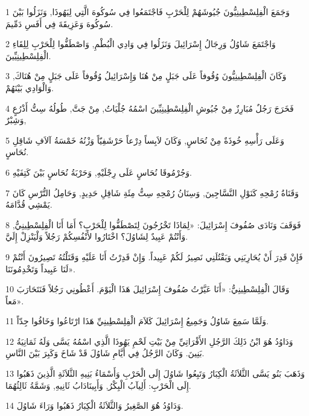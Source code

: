 \par 1 وَجَمَعَ الْفِلِسْطِينِيُّونَ جُيُوشَهُمْ لِلْحَرْبِ فَاجْتَمَعُوا فِي سُوكُوهَ الَّتِي لِيَهُوذَا, وَنَزَلُوا بَيْنَ سُوكُوهَ وَعَزِيقَةَ فِي أَفَسِ دَمِّيمَ.
\par 2 وَاجْتَمَعَ شَاوُلُ وَرِجَالُ إِسْرَائِيلَ وَنَزَلُوا فِي وَادِي الْبُطْمِ, وَاصْطَفُّوا لِلْحَرْبِ لِلِقَاءِ الْفِلِسْطِينِيِّينَ.
\par 3 وَكَانَ الْفِلِسْطِينِيُّونَ وُقُوفاً عَلَى جَبَلٍ مِنْ هُنَا وَإِسْرَائِيلُ وُقُوفاً عَلَى جَبَلٍ مِنْ هُنَاكَ, وَالْوَادِي بَيْنَهُمْ.
\par 4 فَخَرَجَ رَجُلٌ مُبَارِزٌ مِنْ جُيُوشِ الْفِلِسْطِينِيِّينَ اسْمُهُ جُلْيَاتُ, مِنْ جَتَّ, طُولُهُ سِتُّ أَذْرُعٍ وَشِبْرٌ,
\par 5 وَعَلَى رَأْسِهِ خُوذَةٌ مِنْ نُحَاسٍ, وَكَانَ لاَبِساً دِرْعاً حَرْشَفِيّاً وَزْنُهُ خَمْسَةُ آلاَفِ شَاقِلِ نُحَاسٍ.
\par 6 وَجُرْمُوقَا نُحَاسٍ عَلَى رِجْلَيْهِ, وَحَرْبَةُ نُحَاسٍ بَيْنَ كَتِفَيْهِ.
\par 7 وَقَنَاةُ رُمْحِهِ كَنَوْلِ النَّسَّاجِينَ, وَسِنَانُ رُمْحِهِ سِتُّ مِئَةِ شَاقِلِ حَدِيدٍ, وَحَامِلُ التُّرْسِ كَانَ يَمْشِي قُدَّامَهُ.
\par 8 فَوَقَفَ وَنَادَى صُفُوفَ إِسْرَائِيلَ: «لِمَاذَا تَخْرُجُونَ لِتَصْطَفُّوا لِلْحَرْبِ؟ أَمَا أَنَا الْفِلِسْطِينِيُّ, وَأَنْتُمْ عَبِيدٌ لِشَاوُلَ؟ اخْتَارُوا لأَنْفُسِكُمْ رَجُلاً وَلْيَنْزِلْ إِلَيَّ.
\par 9 فَإِنْ قَدِرَ أَنْ يُحَارِبَنِي وَيَقْتُلَنِي نَصِيرُ لَكُمْ عَبِيداً. وَإِنْ قَدِرْتُ أَنَا عَلَيْهِ وَقَتَلْتُهُ تَصِيرُونَ أَنْتُمْ لَنَا عَبِيداً وَتَخْدِمُونَنَا».
\par 10 وَقَالَ الْفِلِسْطِينِيُّ: «أَنَا عَيَّرْتُ صُفُوفَ إِسْرَائِيلَ هَذَا الْيَوْمَ. أَعْطُونِي رَجُلاً فَنَتَحَارَبَ مَعاً».
\par 11 وَلَمَّا سَمِعَ شَاوُلُ وَجَمِيعُ إِسْرَائِيلَ كَلاَمَ الْفِلِسْطِينِيِّ هَذَا ارْتَاعُوا وَخَافُوا جِدّاً.
\par 12 وَدَاوُدُ هُوَ ابْنُ ذَلِكَ الرَّجُلِ الأَفْرَاتِيِّ مِنْ بَيْتِ لَحْمِ يَهُوذَا الَّذِي اسْمُهُ يَسَّى وَلَهُ ثَمَانِيَةُ بَنِينَ. وَكَانَ الرَّجُلُ فِي أَيَّامِ شَاوُلَ قَدْ شَاخَ وَكَبِرَ بَيْنَ النَّاسِ.
\par 13 وَذَهَبَ بَنُو يَسَّى الثَّلاَثَةُ الْكِبَارُ وَتَبِعُوا شَاوُلَ إِلَى الْحَرْبِ وَأَسْمَاءُ بَنِيهِ الثَّلاَثَةِ الَّذِينَ ذَهَبُوا إِلَى الْحَرْبِ: أَلِيآبُ الْبِكْرُ, وَأَبِينَادَابُ ثَانِيهِ, وَشَمَّةُ ثَالِثُهُمَا.
\par 14 وَدَاوُدُ هُوَ الصَّغِيرُ وَالثَّلاَثَةُ الْكِبَارُ ذَهَبُوا وَرَاءَ شَاوُلَ.
